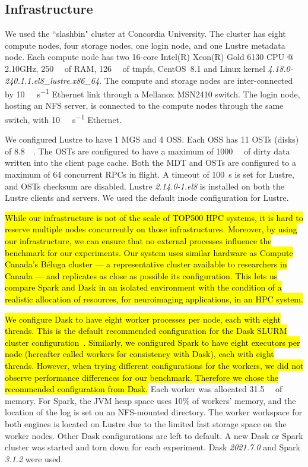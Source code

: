 \documentclass[AMA,STIX1COL]{WileyNJD-v2}
\newcommand{\HL}[1]{\hl{#1}}
\begin{document}
\subsection{Infrastructure}
We used the ``slashbin" cluster at Concordia University.
The cluster has eight compute nodes, four storage nodes, one login node, and one Lustre metadata node.
Each compute node has two 16-core Intel(R) Xeon(R) Gold 6130 CPU @ 2.10GHz,
\SI{250}{\gibi\byte} of RAM, \SI{126}{\gibi\byte} of tmpfs,
CentOS~8.1 and Linux kernel \textit{4.18.0-240.1.1.el8\_lustre.x86\_64}.
The compute and storage nodes are inter-connected by {\SI{10}{\giga\bit\per\second}} Ethernet link through a Mellanox MSN2410 switch.
The login node, hosting an NFS server, is connected to the compute nodes through the same switch, with {\SI{10}{\giga\bit\per\second}} Ethernet.
				
We configured Lustre to have 1 MGS and 4 OSS.
Each OSS has 11 OSTs (disks) of \SI{8.8}{\tebi\byte}.
The OSTs are configured to have a maximum of \SI{1000}{\mebi\byte} of dirty data written into the client page cache.
Both the MDT and OSTs are configured to a maximum of 64 concurrent RPCs in flight.
A timeout of \SI{100}{\second} is set for Lustre, and OSTs checksum are disabled.
Lustre \textit{2.14.0-1.el8} is installed on both the Lustre clients and servers.
We used the default inode configuration for Lustre.

\HL{
	While our infrastructure is not of the scale of TOP500 HPC systems, it is 
	hard to reserve multiple nodes concurrently on those infrastructures.
	Moreover, by using our infrastructure, we can ensure that no external
	processes influence the benchmark for our experiments.
	Our system uses similar hardware as Compute Canada's B\'eluga cluster
	--- a representative cluster available to researchers in Canada --- and
	replicates as close as possible its configuration.
	This lets us compare Spark and Dask in an isolated environment with the
	condition of a realistic allocation of resources, for neuroimaging
	applications, in an HPC system.
}
					
\HL{
	We configure Dask to have eight worker processes per node, each with eight threads.
	This is the default recommended configuration for the Dask SLURM cluster 
	configuration~{\cite{DaskSLURMDoc}}.
	Similarly, we configured Spark to have eight executors per node
	(hereafter called workers for consistency with Dask), each with eight threads.
	However, when trying different configurations for the workers, we did not
	observe performance differences for our benchmark.
	Therefore we chose the recommended configuration from Dask.
}
Each worker was allocated \SI{31.5}{\gibi\byte} of memory.
For Spark, the JVM heap space uses 10\% of workers' memory, and the location of the log is set on an NFS-mounted directory.
The worker workspace for both engines is located on Lustre due to the limited fast storage space on the worker nodes.
Other Dask configurations are left to default.
A new Dask or Spark cluster was started and torn down for each experiment.
Dask \textit{2021.7.0} and Spark \textit{3.1.2} were used.
						
\end{document}
